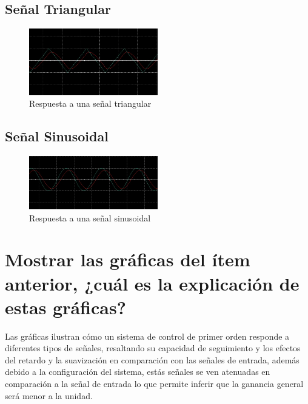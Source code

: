 \documentclass[conference]{IEEEtran}
\begin{document}
	\subsection{Señal Triangular}
	
	\begin{figure}[h]
		\centering
		\includegraphics[width=0.5\textwidth]{media/triangular}
		\caption{Respuesta a una señal triangular}
		\label{fig:triangular}
	\end{figure}
	
	\subsection{Señal Sinusoidal}
	
	\begin{figure}
		\centering
		\includegraphics[width=0.5\textwidth]{media/sinusoidal}
		\caption{Respuesta a una señal sinusoidal}
		\label{fig:sinusoidal}
	\end{figure}
	
	\section{Mostrar las gráficas del ítem anterior, ¿cuál es la explicación de estas gráficas?}
	Las gráficas ilustran cómo un sistema de control de primer orden responde a diferentes tipos de señales, resaltando su capacidad de seguimiento y los efectos del retardo y la suavización en comparación con las señales de entrada, además debido a la configuración del sistema, estás señales se ven atenuadas en comparación a la señal de entrada lo que permite inferir que la ganancia general será menor a la unidad.
	
	
	
	
\end{document}
